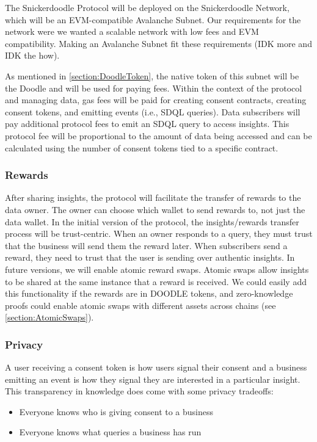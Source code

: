 The Snickerdoodle Protocol will be deployed on the Snickerdoodle Network, which will be an EVM-compatible Avalanche Subnet. Our requirements for the 
network were we wanted a scalable network with low fees and EVM compatibility. Making an Avalanche Subnet fit these requirements (IDK more and IDK the how).

As mentioned in \ref{section:DoodleToken}, the native token of this subnet will be the Doodle and will be used for paying fees. Within the context 
of the protocol and managing data, gas fees will be paid for creating consent contracts, creating consent tokens, and emitting events (i.e., SDQL queries). 
Data subscribers will pay additional protocol fees to emit an SDQL query to access insights. This protocol fee will be proportional to the amount of data 
being accessed and can be calculated using the number of consent tokens tied to a specific contract.

\subsubsection{Rewards}

After sharing insights, the protocol will facilitate the transfer of rewards to the data owner. The owner can choose which wallet to send rewards to, not 
just the data wallet. In the initial version of the protocol, the insights/rewards transfer process will be trust-centric. When an owner responds to a 
query, they must trust that the business will send them the reward later. When subscribers send a reward, they need to trust that the user is sending 
over authentic insights. In future versions, we will enable atomic reward swaps. Atomic swaps allow insights to be shared at the same instance that a 
reward is received. We could easily add this functionality if the rewards are in DOODLE tokens, and zero-knowledge proofs could enable atomic swaps 
with different assets across chains (see \ref{section:AtomicSwaps}).

\subsubsection{Privacy}

A user receiving a consent token is how users signal their consent and a business emitting an event is how they signal they are interested in a particular 
insight. This transparency in knowledge does come with some privacy tradeoffs:
\begin{itemize}
  \item Everyone knows who is giving consent to a business
  \item Everyone knows what queries a business has run
\end{itemize}

